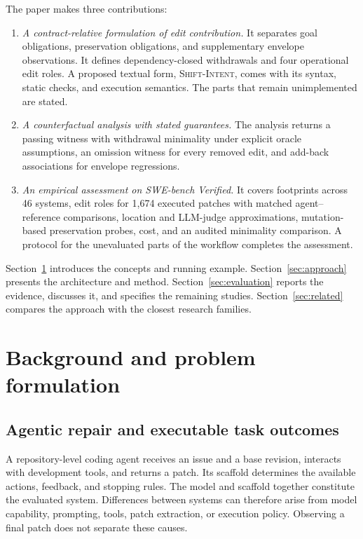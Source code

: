 \documentclass[a4paper,fleqn]{cas-sc}
\newcommand{\dsl}{\textsc{Shift-Intent}}
\begin{document}
The paper makes three contributions:
\begin{enumerate}
\item \emph{A contract-relative formulation of edit contribution.} It separates goal obligations, preservation obligations, and supplementary envelope observations. It defines dependency-closed withdrawals and four operational edit roles. A proposed textual form, \dsl{}, comes with its syntax, static checks, and execution semantics. The parts that remain unimplemented are stated.
\item \emph{A counterfactual analysis with stated guarantees.} The analysis returns a passing witness with withdrawal minimality under explicit oracle assumptions, an omission witness for every removed edit, and add-back associations for envelope regressions.
\item \emph{An empirical assessment on SWE-bench Verified.} It covers footprints across 46 systems, edit roles for 1,674 executed patches with matched agent--reference comparisons, location and LLM-judge approximations, mutation-based preservation probes, cost, and an audited minimality comparison. A protocol for the unevaluated parts of the workflow completes the assessment.
\end{enumerate}

Section~\ref{sec:background} introduces the concepts and running example. Section~\ref{sec:approach} presents the architecture and method. Section~\ref{sec:evaluation} reports the evidence, discusses it, and specifies the remaining studies. Section~\ref{sec:related} compares the approach with the closest research families.

\section{Background and problem formulation}\label{sec:background}

\subsection{Agentic repair and executable task outcomes}\label{sec:agents}

A repository-level coding agent receives an issue and a base revision, interacts with development tools, and returns a patch. Its scaffold determines the available actions, feedback, and stopping rules. The model and scaffold together constitute the evaluated system. Differences between systems can therefore arise from model capability, prompting, tools, patch extraction, or execution policy. Observing a final patch does not separate these causes.
\end{document}
